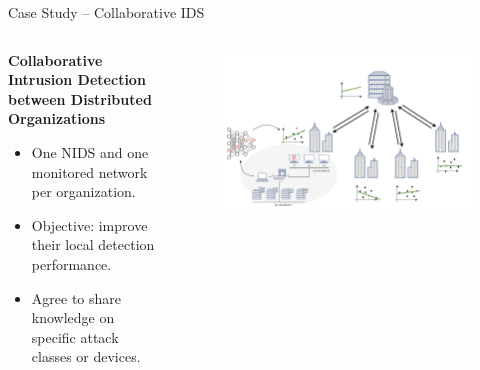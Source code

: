\begin{frame}{Case Study -- Collaborative IDS}

  \begin{columns}
    \begin{column}{0.4\textwidth}
      \textbf{Collaborative Intrusion Detection between Distributed Organizations}
  \begin{itemize}[<+->]
    \item One NIDS and one monitored network per organization.
    \item \alert{Objective:} improve their local detection performance.
    \item Agree to share knowledge on specific attack classes or devices.
  \end{itemize}
    \end{column}
    
    \begin{column}{0.6\textwidth}
      \begin{figure}
        \centering
        \includegraphics[width=1.1\linewidth,right]{figures/intro/cids.drawio.pdf}
      \end{figure}
    \end{column}
  \end{columns}
\end{frame}




